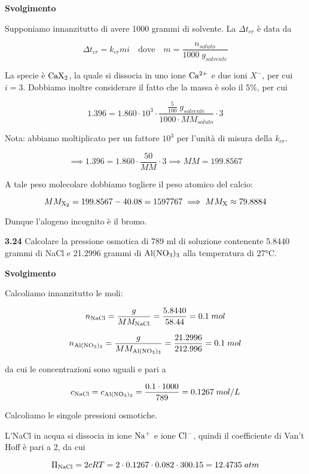 \vspace{0.2cm}\large\textbf{Svolgimento}\normalsize

\vspace{0.2cm}Supponiamo innanzitutto di avere 1000 grammi di solvente. La $\Delta t_{cr}$ è data da

$$\Delta t_{cr}=k_{cr} m i
\quad\text{dove}\quad
m=\frac{n_{soluto}}{1000\;g_{solvente}}$$

La specie è $\rm CaX_2$, la quale si dissocia in uno ione $\rm Ca^{2+}$ e due ioni $X^-$, per cui $i=3$. Dobbiamo inoltre considerare il fatto che la massa è solo il 5\%, per cui

$$1.396=1.860 \cdot 10^3 \cdot \frac{\displaystyle \frac{5}{100}\;g_{solvente}}{1000 \cdot MM_{soluto}} \cdot 3$$

Nota: abbiamo moltiplicato per un fattore $10^3$ per l'unità di misura della $k_{cr}$.

$$\implies
1.396=1.860 \cdot \frac{50}{MM} \cdot 3
\implies
MM=199.8567$$

A tale peso molecolare dobbiamo togliere il peso atomico del calcio:

$$MM_{\rm X_2}=199.8567-40.08=1597767
\implies
MM_{\rm X} \approx 79.8884$$

Dunque l'alogeno incognito è il bromo.

\vspace{0.2cm}\textbf{3.24} Calcolare la pressione osmotica di 789 ml di soluzione contenente 5.8440 grammi di NaCl e  21.2996 grammi di $\rm Al(NO_3)_3$ alla temperatura di 27°C.

\vspace{0.2cm}\large\textbf{Svolgimento}\normalsize

\vspace{0.2cm}Calcoliamo innanzitutto le moli:

$$n_{\rm NaCl}=\frac{g}{MM_{\rm NaCl}}
=\frac{5.8440}{58.44}=0.1\;mol$$

$$n_{\rm Al(NO_3)_3}=\frac{g}{MM_{\rm Al(NO_3)_3}}
=\frac{21.2996}{212.996}=0.1\;mol$$

da cui le concentrazioni sono uguali e pari a

$$c_{\rm NaCl}=c_{\rm Al(NO_3)_3}=\frac{0.1 \cdot 1000}{789}
=0.1267\;mol/L$$

Calcoliamo le singole pressioni osmotiche.

L'NaCl in acqua si dissocia in ione $\rm Na^+$ e ione $\rm Cl^-$, quindi il coefficiente di Van't Hoff è pari a 2, da cui

$$\Pi_{\rm NaCl}=2cRT=2 \cdot 0.1267 \cdot 0.082 \cdot 300.15=12.4735\;atm$$

